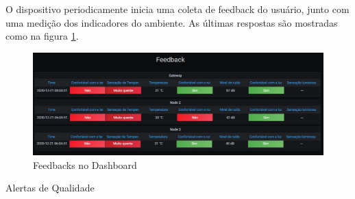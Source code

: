 \documentclass[../monografia.tex]{subfiles}
\begin{document}
O dispositivo periodicamente inicia uma coleta de feedback do usuário, junto com uma medição dos indicadores do ambiente. As últimas respostas são mostradas como na figura \ref{fig:dashboard-feedback}. 

\begin{figure}[h]
	\centering
	\includegraphics[width=\textwidth]{dashboard-feedback}
	\caption{Feedbacks no Dashboard}
	\label{fig:dashboard-feedback}
\end{figure}

Alertas de Qualidade
\end{document}
